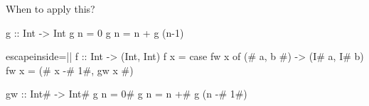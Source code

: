 \documentclass{haskellbeamer}
\begin{document}
\begin{frame}[fragile]{When to apply this?}
\begin{minipage}{0.6\textwidth}
\begin{center}
\begin{overprint}
\begin{haskell}
            g :: Int -> Int
            g n = 0
            g n = n + g (n-1)
          \end{haskell}
          \begin{haskell*}{escapeinside=||}
            f :: Int -> (Int, Int)
            f x = case fw x of
              (# a, b #) -> (I# a, I# b)
            fw x = (# x -# 1#, gw x #)

            gw :: Int# -> Int#
            g n = 0#
            g n = n +# g (n -# 1#)
          \end{haskell*}
        \end{overprint}
      \end{center}
    \end{minipage}
\end{frame}
\end{document}
